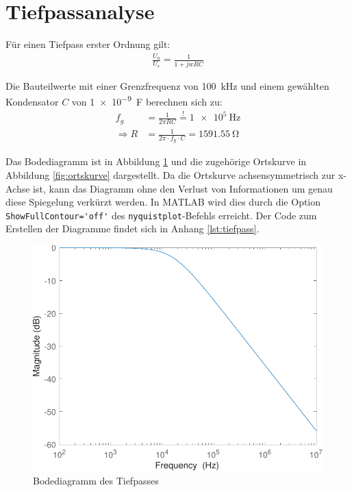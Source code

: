 \documentclass[
    paper=a4,
    fontsize=10pt,
    DIV=13,
    oneside,
]{scrartcl}
\begin{document}
\section{Tiefpassanalyse}
    Für einen Tiefpass erster Ordnung gilt:
    \begin{align}
        \label{eq:tp}
        \frac{U_a}{U_e} = \frac{1}{1+jwRC}
    \end{align}

    Die Bauteilwerte mit einer Grenzfrequenz von \SI{100}{\kilo\hertz} und einem gewählten Kondensator \(C\) von \SI{1e-9}{\farad} berechnen sich zu:
    \begin{align}
        f_g &= \frac{1}{2 \pi RC} \overset{!}{=} \SI{1e5}{\hertz}\\
        \Rightarrow R&= \frac{1}{2 \pi \cdot f_g \cdot C }= \SI{1591.55}{\ohm}
    \end{align}

    Das Bodediagramm ist in Abbildung \ref{fig:bode} und die zugehörige Ortskurve in Abbildung \ref{fig:ortskurve} dargestellt. Da die Ortskurve achsensymmetrisch zur x-Achse ist, kann das Diagramm ohne den Verlust von Informationen um genau diese Spiegelung verkürzt werden. In MATLAB wird dies durch die Option \verb|ShowFullContour='off'| des \verb|nyquistplot|-Befehls erreicht. Der Code zum Erstellen der Diagramme findet sich in Anhang \ref{lst:tiefpass}.

    \begin{figure}
        \centering
        \includegraphics[width=\imagewidth]{../versuch1/bode.pdf}
        \caption{Bodediagramm des Tiefpasses}
        \label{fig:bode}
    \end{figure}
\end{document}
